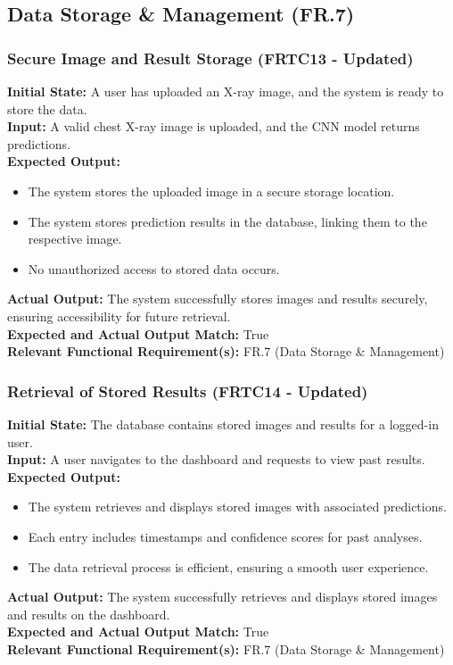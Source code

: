 \documentclass[12pt, titlepage]{article}
\begin{document}
\subsection{Data Storage \& Management (FR.7)}
\subsubsection{Secure Image and Result Storage (FRTC13 - Updated)}
\textbf{Initial State:} A user has uploaded an X-ray image, and the system is ready to store the data.\\
\textbf{Input:} A valid chest X-ray image is uploaded, and the CNN model returns predictions.\\
\textbf{Expected Output:}
\begin{itemize}
\item The system stores the uploaded image in a secure storage location.
\item The system stores prediction results in the database, linking them to the respective image.
\item No unauthorized access to stored data occurs.
\end{itemize}
\textbf{Actual Output:} The system successfully stores images and results securely, ensuring accessibility for future retrieval.\\
\textbf{Expected and Actual Output Match:} True\\
\textbf{Relevant Functional Requirement(s):} FR.7 (Data Storage \& Management)

\subsubsection{Retrieval of Stored Results (FRTC14 - Updated)}
\textbf{Initial State:} The database contains stored images and results for a logged-in user.\\
\textbf{Input:} A user navigates to the dashboard and requests to view past results.\\
\textbf{Expected Output:}
\begin{itemize}
\item The system retrieves and displays stored images with associated predictions.
\item Each entry includes timestamps and confidence scores for past analyses.
\item The data retrieval process is efficient, ensuring a smooth user experience.
\end{itemize}
\textbf{Actual Output:} The system successfully retrieves and displays stored images and results on the dashboard.\\
\textbf{Expected and Actual Output Match:} True\\
\textbf{Relevant Functional Requirement(s):} FR.7 (Data Storage \& Management)
\end{document}
